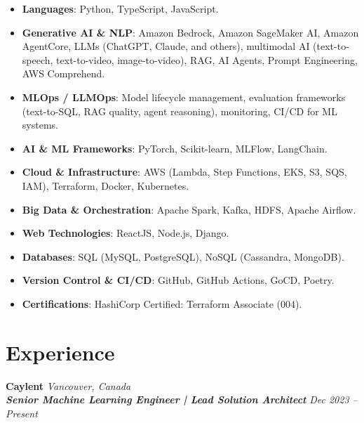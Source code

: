 \documentclass[10pt,a4paper]{article}
\begin{document}
\begin{itemize}[leftmargin=*, itemsep=1pt, label=\textbullet]
  \item \textbf{Languages}: Python, TypeScript, JavaScript.
  \item \textbf{Generative AI \& NLP}: Amazon Bedrock, Amazon SageMaker AI, Amazon AgentCore, LLMs (ChatGPT, Claude, and others), multimodal AI (text-to-speech, text-to-video, image-to-video), RAG, AI Agents, Prompt Engineering, AWS Comprehend.
  \item \textbf{MLOps / LLMOps}: Model lifecycle management, evaluation frameworks (text-to-SQL, RAG quality, agent reasoning), monitoring, CI/CD for ML systems.
  \item \textbf{AI \& ML Frameworks}: PyTorch, Scikit-learn, MLFlow, LangChain.
  \item \textbf{Cloud \& Infrastructure}: AWS (Lambda, Step Functions, EKS, S3, SQS, IAM), Terraform, Docker, Kubernetes.
  \item \textbf{Big Data \& Orchestration}: Apache Spark, Kafka, HDFS, Apache Airflow.
  \item \textbf{Web Technologies}: ReactJS, Node.js, Django.
  \item \textbf{Databases}: SQL (MySQL, PostgreSQL), NoSQL (Cassandra, MongoDB).
  \item \textbf{Version Control \& CI/CD}: GitHub, GitHub Actions, GoCD, Poetry.
  \item \textbf{Certifications}: HashiCorp Certified: Terraform Associate (004).
\end{itemize}

\section{Experience}

\noindent\textbf{Caylent} \hfill \textit{Vancouver, Canada} \\
\textit{\textbf{Senior Machine Learning Engineer | Lead Solution Architect}} \hfill \textit{Dec 2023 -- Present}
\end{document}
